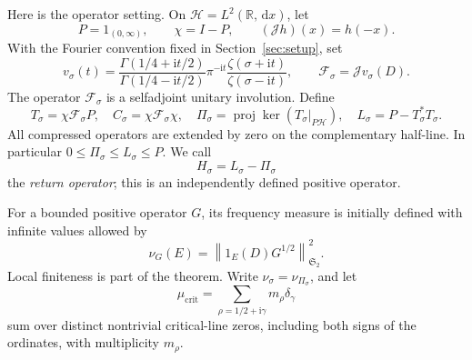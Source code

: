 \documentclass[11pt]{article}
\numberwithin{equation}{section}
\theoremstyle{definition}
\theoremstyle{remark}
\newcommand{\HH}{\mathcal H}
\newcommand{\ii}{\mathrm i}
\newcommand{\Id}{I}
\newcommand{\J}{\mathcal J}
\newcommand{\Fcal}{\mathcal F}
\newcommand{\Stwo}{\mathfrak S_2}
\newcommand{\norm}[1]{\left\lVert #1\right\rVert}
\newcommand{\dd}{\,\mathrm d}
\newcommand{\mucrit}{\mu_{\mathrm{crit}}}
\begin{document}
Here is the operator setting. On \(\HH=L^2(\mathbb R,\dd x)\), let
\[
P=1_{(0,\infty)},\qquad \chi=\Id-P,\qquad
(\J h)(x)=h(-x).
\]
With the Fourier convention fixed in Section~\ref{sec:setup}, set
\begin{equation}\label{eq:phase-intro}
v_\sigma(t)=
\frac{\Gamma(1/4+\ii t/2)}{\Gamma(1/4-\ii t/2)}
\pi^{-\ii t}
\frac{\zeta(\sigma+\ii t)}{\zeta(\sigma-\ii t)},
\qquad
\Fcal_\sigma=\J v_\sigma(D).
\end{equation}
The operator \(\Fcal_\sigma\) is a selfadjoint unitary involution. Define
\begin{equation}\label{eq:operators-intro}
T_\sigma=\chi\Fcal_\sigma P,\quad
C_\sigma=\chi\Fcal_\sigma\chi,\quad
\Pi_\sigma=\operatorname{proj}\ker(T_\sigma|_{P\HH}),
\quad L_\sigma=P-T_\sigma^*T_\sigma.
\end{equation}
All compressed operators are extended by zero on the complementary
half-line. In particular \(0\le\Pi_\sigma\le L_\sigma\le P\).
We call
\[
H_\sigma=L_\sigma-\Pi_\sigma
\]
the \emph{return operator}; this is an independently defined positive
operator.

For a bounded positive operator \(G\), its frequency measure is initially
defined with infinite values allowed by
\begin{equation}\label{eq:measure-intro}
\nu_G(E)=\norm{1_E(D)G^{1/2}}_{\Stwo}^2.
\end{equation}
Local finiteness is part of the theorem. Write
\(\nu_\sigma=\nu_{\Pi_\sigma}\), and let
\[
\mucrit=\sum_{\rho=1/2+\ii\gamma}m_\rho\delta_\gamma
\]
sum over distinct nontrivial critical-line zeros, including both signs
of the ordinates, with multiplicity \(m_\rho\).
\end{document}
